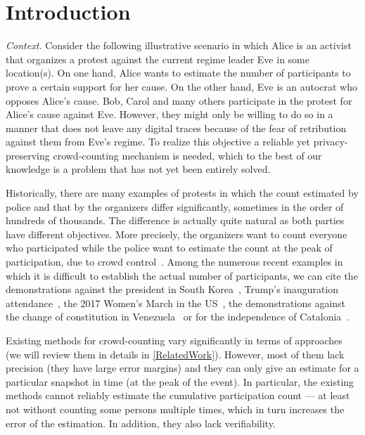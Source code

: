\section{Introduction}%
\label{Introduction}

\emph{Context.} Consider the following illustrative scenario in which Alice is an activist that organizes a protest against the current regime leader Eve in some location(s).
On one hand, Alice wants to estimate the number of participants to prove a certain support for her cause.
On the other hand, Eve is an autocrat who opposes Alice's cause.
Bob, Carol and many others participate in the protest for Alice's cause against Eve.
However, they might only be willing to do so in a manner that does not leave any digital traces because of the fear of retribution against them from Eve's regime. 
To realize this objective a reliable yet privacy-preserving crowd-counting mechanism is needed, which to the best of our knowledge is a problem that has not yet been entirely solved.

Historically, there are many examples of protests in which the count estimated by police and that by the organizers 
differ significantly, sometimes in the order of hundreds of thousands.
The difference is actually quite natural as both parties have different objectives.
More precisely, the organizers want to count everyone who participated while the police want to estimate the count at the peak of participation, due to crowd control~\cite{2016DemonstrationsInSeoul}.
Among the numerous recent examples in which it is difficult to establish the actual number of participants, we can cite the demonstrations against the president in South Korea~\cite{2016DemonstrationsInSeoul}, Trump's inauguration attendance~\cite{HowWillWeKnowTrumpInauguralCrowdSize}, the 2017 Women's March in the US~\cite{2017WomensMarchesInUS}, the demonstrations against the change of constitution in Venezuela~\cite{AlJazeeraOnVenezuela2017} or for the independence of Catalonia~\cite{CataloniaDemonstrations}.

Existing methods for crowd-counting vary significantly in terms of approaches (we will review them in details in \cref{RelatedWork}).
However, most of them lack precision (\ie they have large error margins) and they can only give an estimate for a particular snapshot in time (\eg at the peak of the event). 
In particular, the existing methods cannot reliably estimate the cumulative participation count --- at least not without counting some persons multiple times, which in turn increases the error of the estimation.
In addition, they also lack verifiability. 

